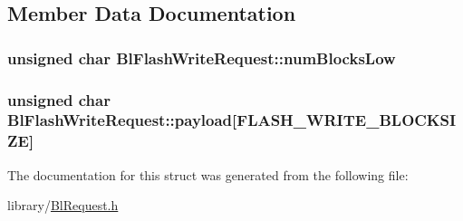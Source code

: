 \subsection{Member Data Documentation}
\hypertarget{struct_bl_flash_write_request_abff06b9442ac201c7bfb163705c90cf5}{
\subsubsection[{num\-Blocks\-Low}]{\setlength{\rightskip}{0pt plus 5cm}unsigned char Bl\-Flash\-Write\-Request\-::num\-Blocks\-Low}}\label{struct_bl_flash_write_request_abff06b9442ac201c7bfb163705c90cf5}
\hypertarget{struct_bl_flash_write_request_af4981efac8d54dcf31f7666f22df17f5}{
\subsubsection[{payload}]{\setlength{\rightskip}{0pt plus 5cm}unsigned char Bl\-Flash\-Write\-Request\-::payload\mbox{[}{\bf F\-L\-A\-S\-H\-\_\-\-W\-R\-I\-T\-E\-\_\-\-B\-L\-O\-C\-K\-S\-I\-Z\-E}\mbox{]}}}\label{struct_bl_flash_write_request_af4981efac8d54dcf31f7666f22df17f5}


The documentation for this struct was generated from the following file\-:\begin{DoxyCompactItemize}
\item 
library/\hyperlink{_bl_request_8h}{Bl\-Request.\-h}\end{DoxyCompactItemize}
